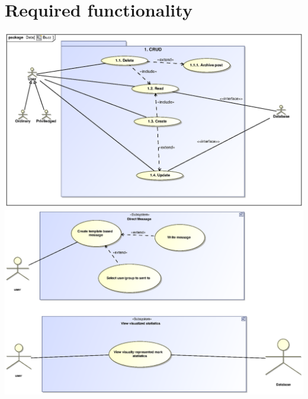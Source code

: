 \documentclass{scrreprt}
\begin{document}
\chapter{Required functionality} 							%
\includegraphics[scale=.9]{CRUDUSECASE.eps}\\
\includegraphics[scale=.9]{seanUC.eps}\\
\end{document}
